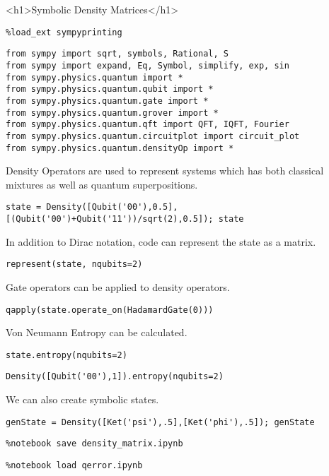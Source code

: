 <h1>Symbolic Density Matrices</h1>

\begin{verbatim}
%load_ext sympyprinting
\end{verbatim}

\begin{verbatim}
from sympy import sqrt, symbols, Rational, S
from sympy import expand, Eq, Symbol, simplify, exp, sin
from sympy.physics.quantum import *
from sympy.physics.quantum.qubit import *
from sympy.physics.quantum.gate import *
from sympy.physics.quantum.grover import *
from sympy.physics.quantum.qft import QFT, IQFT, Fourier
from sympy.physics.quantum.circuitplot import circuit_plot
from sympy.physics.quantum.densityOp import *
\end{verbatim}

Density Operators are used to represent systems which has both classical
mixtures as well as quantum superpositions.

\begin{verbatim}
state = Density([Qubit('00'),0.5],[(Qubit('00')+Qubit('11'))/sqrt(2),0.5]); state
\end{verbatim}

In addition to Dirac notation, code can represent the state as a matrix.

\begin{verbatim}
represent(state, nqubits=2)
\end{verbatim}

Gate operators can be applied to density operators.

\begin{verbatim}
qapply(state.operate_on(HadamardGate(0)))
\end{verbatim}

Von Neumann Entropy can be calculated.

\begin{verbatim}
state.entropy(nqubits=2)
\end{verbatim}

\begin{verbatim}
Density([Qubit('00'),1]).entropy(nqubits=2)
\end{verbatim}

We can also create symbolic states.

\begin{verbatim}
genState = Density([Ket('psi'),.5],[Ket('phi'),.5]); genState
\end{verbatim}

\begin{verbatim}
%notebook save density_matrix.ipynb
\end{verbatim}

\begin{verbatim}
%notebook load qerror.ipynb
\end{verbatim}

